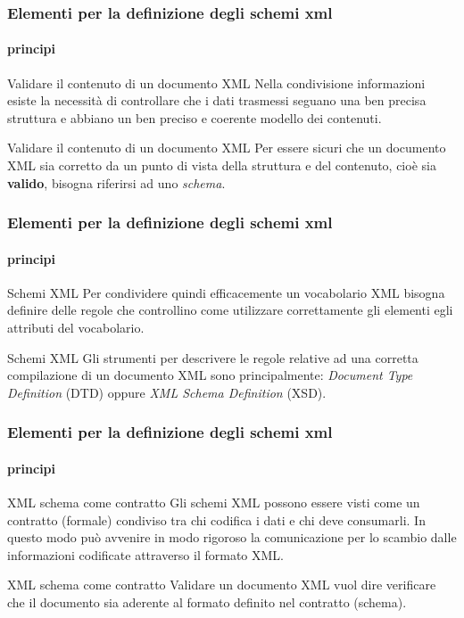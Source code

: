 \begin{frame}
    \frametitle{Elementi per la definizione degli schemi xml}
    \framesubtitle{principi}
    \addtocounter{nframe}{1}

    \begin{block}{Validare il contenuto di un documento XML}
        Nella condivisione informazioni esiste la necessità di controllare che i dati trasmessi seguano una ben precisa struttura e abbiano un ben preciso e coerente modello dei contenuti.
    \end{block}
   
    \begin{block}{Validare il contenuto di un documento XML}
       Per essere sicuri che un documento XML sia corretto da un punto di vista della struttura e del contenuto, cioè sia \textbf{valido}, bisogna riferirsi ad uno \textit{schema}.
    \end{block}


\end{frame}


\begin{frame}
    \frametitle{Elementi per la definizione degli schemi xml}
    \framesubtitle{principi}
    \addtocounter{nframe}{1}

    \begin{block}{Schemi XML}
        Per condividere quindi efficacemente un vocabolario XML bisogna definire delle regole che controllino come utilizzare correttamente gli elementi egli attributi del vocabolario.
    \end{block}
   
    \begin{block}{Schemi XML}
        Gli strumenti per descrivere le regole relative ad una corretta compilazione di un documento XML sono principalmente: \textit{Document Type Definition} (DTD) oppure \textit{XML Schema Definition} (XSD).
    \end{block}


\end{frame}

\begin{frame}
    \frametitle{Elementi per la definizione degli schemi xml}
    \framesubtitle{principi}
    \addtocounter{nframe}{1}

\begin{block}{XML schema come contratto} 
    Gli schemi XML possono essere visti come un contratto (formale) condiviso tra chi codifica i dati e chi deve consumarli. In questo modo può avvenire in modo rigoroso la comunicazione per lo scambio dalle informazioni codificate attraverso il formato XML.
\end{block}

\begin{block}{XML schema come contratto} 
    Validare un documento XML vuol dire verificare che il documento sia aderente al formato definito nel contratto (schema).
\end{block}


\end{frame}

